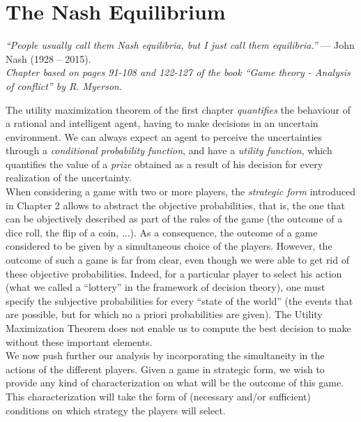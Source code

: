 \ifx \globalmark \undefined %
	
\else
\fi




\chapter{The Nash Equilibrium} \label{chap:Nash}
{\large{\itshape
``People usually call them Nash equilibria, but I just call them equilibria.''} --- John Nash (1928 -- 2015).\\
}
{\small{\itshape
Chapter based on pages 91-108 and 122-127 of the book  ``Game theory - Analysis of conflict'' by R. Myerson.}\\
}


The utility maximization theorem of the first chapter \emph{quantifies} the behaviour
of a rational and intelligent agent, having to make decisions in an uncertain environment.
We can always expect an agent to perceive the uncertainties through a \emph{conditional probability function}, and have a \emph{utility function},
which quantifies the value of a \emph{prize} obtained as a result of his decision for every realization of the uncertainty. \\
When considering a game with two or more players, the \emph{strategic form} introduced in Chapter 2 allows
to abstract the objective probabilities, that is, the one that can be objectively described as part of the rules of the game (the outcome of a dice roll, the flip of a coin, ...).
As a consequence,  the outcome of a game considered to be given by a simultaneous choice of the players.
However,
 the outcome of such a game is far from clear,
  even though we were able to get rid of these objective
  probabilities.
  Indeed, for a particular player to select his action
   (what we called a ``lottery'' in the framework of decision theory),
    one must specify the subjective probabilities
    for every ``state of the world''
     (the events that are possible, but for which no a priori probabilities are given).
     The Utility Maximization Theorem does not enable us to compute the best decision to make without these important elements.
 \\
We now push further our analysis by
incorporating the simultaneity in the actions of the
different players.
Given a game in strategic form,
 we wish to provide any kind of
 characterization on what will be the outcome of this game.
  This characterization will take the form of (necessary and/or sufficient) conditions on which strategy the players will select.
